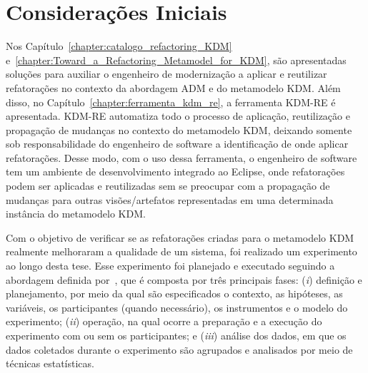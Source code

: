 \section{Considerações Iniciais}

Nos Capítulo~\ref{chapter:catalogo_refactoring_KDM} e~\ref{chapter:Toward_a_Refactoring_Metamodel_for_KDM}, são apresentadas soluções para auxiliar o engenheiro de modernização a aplicar e reutilizar refatorações no contexto da abordagem ADM e do metamodelo KDM. Além disso, no Capítulo~\ref{chapter:ferramenta_kdm_re}, a ferramenta KDM-RE é apresentada. KDM-RE automatiza todo o processo de aplicação, reutilização e propagação de mudanças no contexto do metamodelo KDM, deixando somente sob responsabilidade do engenheiro de software a identificação de onde aplicar refatorações. Desse modo, com o uso dessa ferramenta, o engenheiro de software tem um ambiente de desenvolvimento integrado ao Eclipse, onde refatorações podem ser aplicadas e reutilizadas sem se preocupar com a propagação de mudanças para outras visões/artefatos representadas em uma determinada instância do metamodelo KDM.

Com o objetivo de verificar se as refatorações criadas para o metamodelo KDM realmente melhoraram a qualidade de um sistema, foi realizado um experimento ao longo desta tese. Esse experimento foi planejado e executado seguindo a abordagem definida por~, que é composta por três principais fases: (\textit{i}) definição e planejamento, por meio da qual são especificados o contexto, as hipóteses, as variáveis, os participantes (quando necessário), os instrumentos e o modelo do experimento; (\textit{ii}) operação, na qual ocorre a preparação e a execução do experimento com ou sem os participantes; e (\textit{iii}) análise dos dados, em que os dados coletados durante o experimento são agrupados e analisados por meio de técnicas estatísticas.



